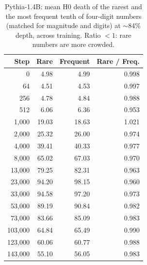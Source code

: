 
\begin{table}[t]
\centering
\small
\begin{tabular}{rrrr}
\toprule
Step & Rare & Frequent & Rare / Freq. \\
\midrule
0 & 4.98 & 4.99 & 0.998 \\
64 & 4.51 & 4.53 & 0.997 \\
256 & 4.78 & 4.84 & 0.988 \\
512 & 6.06 & 6.36 & 0.953 \\
1{,}000 & 19.03 & 18.63 & 1.021 \\
2{,}000 & 25.32 & 26.00 & 0.974 \\
4{,}000 & 39.41 & 40.33 & 0.977 \\
8{,}000 & 65.02 & 67.03 & 0.970 \\
13{,}000 & 79.25 & 82.31 & 0.963 \\
23{,}000 & 94.20 & 98.15 & 0.960 \\
33{,}000 & 94.58 & 97.20 & 0.973 \\
53{,}000 & 89.19 & 90.84 & 0.982 \\
73{,}000 & 83.66 & 85.09 & 0.983 \\
103{,}000 & 64.84 & 65.49 & 0.990 \\
123{,}000 & 60.06 & 60.77 & 0.988 \\
143{,}000 & 55.10 & 56.05 & 0.983 \\
\bottomrule
\end{tabular}
\caption{Pythia-1.4B: mean H0 death of the rarest and the most frequent tenth of four-digit numbers
(matched for magnitude and digits) at $\sim$84\% depth, across training. Ratio $<1$: rare numbers are more crowded.}
\label{tab:ckpt_pythia}
\end{table}

